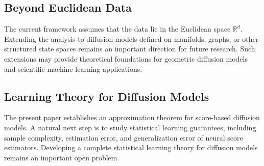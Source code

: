 \documentclass[11pt]{article}
\begin{document}
\subsection{Beyond Euclidean Data}

The current framework assumes that the data lie in the Euclidean space $\mathbb{R}^d$. Extending the analysis to diffusion models defined on manifolds, graphs, or other structured state spaces remains an important direction for future research. Such extensions may provide theoretical foundations for geometric diffusion models and scientific machine learning applications.

\subsection{Learning Theory for Diffusion Models}

The present paper establishes an approximation theorem for score-based diffusion models. A natural next step is to study statistical learning guarantees, including sample complexity, estimation error, and generalization error of neural score estimators. Developing a complete statistical learning theory for diffusion models remains an important open problem.


\end{document}

